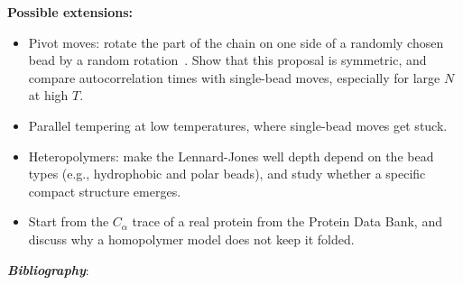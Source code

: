 \noindent\textbf{Possible extensions:}
\begin{itemize}
  \item Pivot moves: rotate the part of the chain on one side of a randomly chosen bead by a random rotation~\cite{Madras:1988}.
        Show that this proposal is symmetric, and compare autocorrelation times with single-bead moves, especially for large $N$ at high $T$.
  \item Parallel tempering at low temperatures, where single-bead moves get stuck.
  \item Heteropolymers: make the Lennard-Jones well depth depend on the bead types (e.g., hydrophobic and polar beads), and study whether a specific compact structure emerges.
  \item Start from the $C_\alpha$ trace of a real protein from the Protein Data Bank, and discuss why a homopolymer model does not keep it folded.
\end{itemize}

\newpage

\noindent\textbf{\emph{Bibliography}}:\\
\printbibliography[heading=none]


